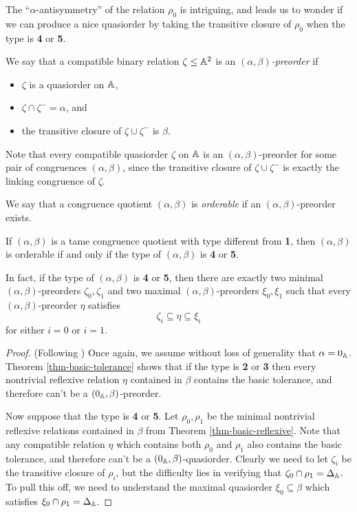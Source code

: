 \begin{appendices}
The ``$\alpha$-antisymmetry'' of the relation $\rho_0$ is intriguing, and leads us to wonder if we can produce a nice quasiorder by taking the transitive closure of $\rho_0$ when the type is \textbf{4} or \textbf{5}.

\begin{defn} We say that a compatible binary relation $\zeta \le \mathbb{A}^2$ is an \emph{$(\alpha,\beta)$-preorder} if
\begin{itemize}
\item $\zeta$ is a quasiorder on $\mathbb{A}$,
\item $\zeta \cap \zeta^- = \alpha$, and
\item the transitive closure of $\zeta \cup \zeta^-$ is $\beta$.
\end{itemize}
Note that every compatible quasiorder $\zeta$ on $\mathbb{A}$ is an $(\alpha,\beta)$-preorder for some pair of congruences $(\alpha,\beta)$, since the transitive closure of $\zeta \cup \zeta^-$ is exactly the linking congruence of $\zeta$.

We say that a congruence quotient $(\alpha,\beta)$ is \emph{orderable} if an $(\alpha,\beta)$-preorder exists.
\end{defn}

\begin{thm} If $(\alpha,\beta)$ is a tame congruence quotient with type different from \textbf{1}, then $(\alpha, \beta)$ is orderable if and only if the type of $(\alpha,\beta)$ is \textbf{4} or \textbf{5}.

In fact, if the type of $(\alpha,\beta)$ is \textbf{4} or \textbf{5}, then there are exactly two minimal $(\alpha,\beta)$-preorders $\zeta_0, \zeta_1$ and two maximal $(\alpha,\beta)$-preorders $\xi_0, \xi_1$ such that every $(\alpha,\beta)$-preorder $\eta$ satisfies
\[
\zeta_i \subseteq \eta \subseteq \xi_i
\]
for either $i = 0$ or $i = 1$.
\end{thm}
\begin{proof} (Following \cite{hobby-mckenzie}) Once again, we assume without loss of generality that $\alpha = 0_{\mathbb{A}}$. Theorem \ref{thm-basic-tolerance} shows that if the type is \textbf{2} or \textbf{3} then every nontrivial reflexive relation $\eta$ contained in $\beta$ contains the basic tolerance, and therefore can't be a $(0_{\mathbb{A}}, \beta)$-preorder.

Now suppose that the type is \textbf{4} or \textbf{5}. Let $\rho_0, \rho_1$ be the minimal nontrivial reflexive relations contained in $\beta$ from Theorem \ref{thm-basic-reflexive}. Note that any compatible relation $\eta$ which contains both $\rho_0$ and $\rho_1$ also contains the basic tolerance, and therefore can't be a $(0_{\mathbb{A}},\beta)$-quasiorder. Clearly we need to let $\zeta_i$ be the transitive closure of $\rho_i$, but the difficulty lies in verifying that $\zeta_0 \cap \rho_1 = \Delta_{\mathbb{A}}$. To pull this off, we need to understand the maximal quasiorder $\xi_0 \subseteq \beta$ which satisfies $\xi_0 \cap \rho_1 = \Delta_{\mathbb{A}}$.


\end{proof}
\end{appendices}
